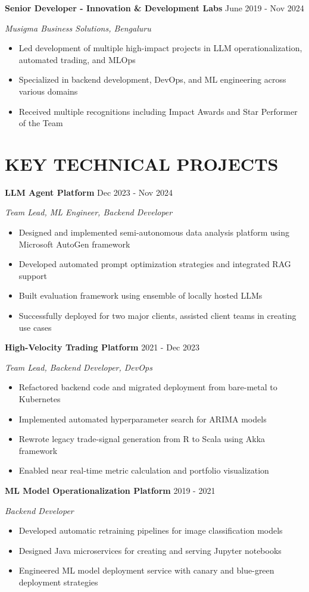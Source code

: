 \documentclass[fontsize=11pt]{article}
\newcommand{\NewPart}[1]{\section*{\uppercase{#1}}}
\newcommand{\WorkEntry}[4]{
    \noindent \textbf{#1} \hfill {#2} \par
    \noindent \textit{#3} \par
    \noindent \small #4
    \normalsize \par}
\newcommand{\ProjectEntry}[4]{
    \noindent \textbf{#1} \hfill {#2} \par
    \noindent \textit{#3} \par
    \noindent \small #4
    \normalsize \par}
\begin{document}
\WorkEntry
{Senior Developer - Innovation \& Development Labs}
{June 2019 - Nov 2024}
{Musigma Business Solutions, Bengaluru}
{%
\begin{itemize}
\item Led development of multiple high-impact projects in LLM operationalization, automated trading, and MLOps
\item Specialized in backend development, DevOps, and ML engineering across various domains
\item Received multiple recognitions including Impact Awards and Star Performer of the Team
\end{itemize}}



\NewPart{KEY TECHNICAL PROJECTS}

\ProjectEntry{LLM Agent Platform}{Dec 2023 - Nov 2024}{Team Lead, ML Engineer, Backend Developer}
{%
\begin{itemize}
\item Designed and implemented semi-autonomous data analysis platform using Microsoft AutoGen framework
\item Developed automated prompt optimization strategies and integrated RAG support
\item Built evaluation framework using ensemble of locally hosted LLMs
\item Successfully deployed for two major clients, assisted client teams in creating use cases
\end{itemize}}

\ProjectEntry{High-Velocity Trading Platform}{2021 - Dec 2023}{Team Lead, Backend Developer, DevOps}
{%
\begin{itemize}
\item Refactored backend code and migrated deployment from bare-metal to Kubernetes
\item Implemented automated hyperparameter search for ARIMA models
\item Rewrote legacy trade-signal generation from R to Scala using Akka framework
\item Enabled near real-time metric calculation and portfolio visualization
\end{itemize}}

\ProjectEntry{ML Model Operationalization Platform}{2019 - 2021}{Backend Developer}
{%
\begin{itemize}
\item Developed automatic retraining pipelines for image classification models
\item Designed Java microservices for creating and serving Jupyter notebooks
\item Engineered ML model deployment service with canary and blue-green deployment strategies
\end{itemize}}
\end{document}
